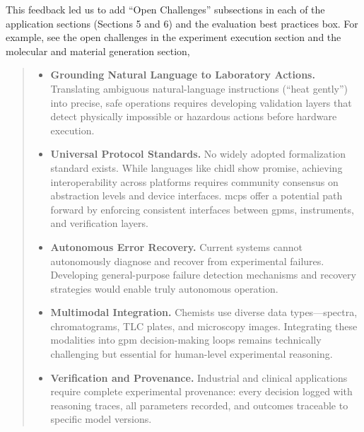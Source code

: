 \begin{reply}
This feedback led us to add ``Open Challenges'' subsections in each of the application sections (Sections 5 and 6) and the evaluation best practices box.
For example, see the open challenges in the experiment execution section and the molecular and material generation section,

\begin{quote}
    
\begin{itemize}
\item \textbf{Grounding Natural Language to Laboratory Actions.} Translating ambiguous natural-language instructions (\enquote{heat gently}) into precise, safe operations requires developing validation layers that detect physically impossible or hazardous actions before hardware execution.

\item \textbf{Universal Protocol Standards.} No widely adopted formalization standard exists. While languages like \gls{chidl} show promise, achieving interoperability across platforms requires community consensus on abstraction levels and device interfaces. \Glspl{mcp} offer a potential path forward by enforcing consistent interfaces between \glspl{gpm}, instruments, and verification layers.

\item \textbf{Autonomous Error Recovery.} Current systems cannot autonomously diagnose and recover from experimental failures. Developing general-purpose failure detection mechanisms and recovery strategies would enable truly autonomous operation.

\item \textbf{Multimodal Integration.} Chemists use diverse data types---spectra, chromatograms, TLC plates, and microscopy images. Integrating these modalities into \gls{gpm} decision-making loops remains technically challenging but essential for human-level experimental reasoning.

\item \textbf{Verification and Provenance.} Industrial and clinical applications require complete experimental provenance: every decision logged with reasoning traces, all parameters recorded, and outcomes traceable to specific model versions.
\end{itemize}
\end{quote}


\begin{quote}
    

\end{quote}
\end{reply}
